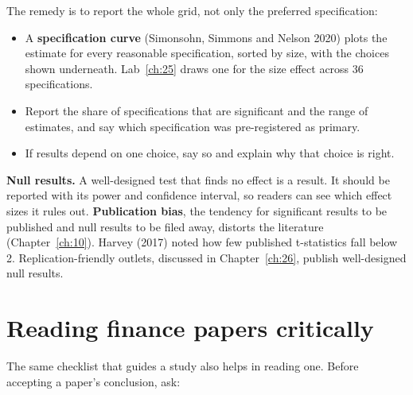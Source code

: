The remedy is to report the whole grid, not only the preferred specification:

\begin{itemize}
  \item A \textbf{specification curve} (Simonsohn, Simmons and Nelson 2020) plots the estimate for every reasonable specification, sorted by size, with the choices shown underneath. Lab~\ref{ch:25} draws one for the size effect across 36 specifications.
  \item Report the share of specifications that are significant and the range of estimates, and say which specification was pre-registered as primary.
  \item If results depend on one choice, say so and explain why that choice is right.
\end{itemize}

\textbf{Null results.} A well-designed test that finds no effect is a result. It should be reported with its power and confidence interval, so readers can see which effect sizes it rules out. \textbf{Publication bias}, the tendency for significant results to be published and null results to be filed away, distorts the literature (Chapter~\ref{ch:10}). Harvey (2017) noted how few published t-statistics fall below 2. Replication-friendly outlets, discussed in Chapter~\ref{ch:26}, publish well-designed null results.

\section{Reading finance papers critically}
\label{sec:25-reading}

The same checklist that guides a study also helps in reading one. Before accepting a paper's conclusion, ask:

